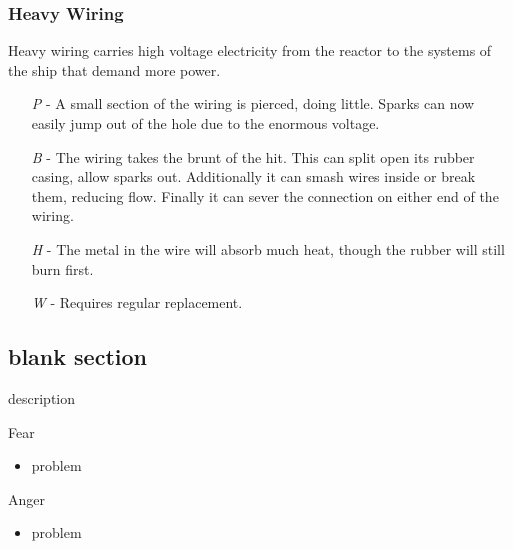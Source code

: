 \documentclass[a4paper]{article}
\begin{document}
\vspace{-0.5cm} \hspace{-18pt} \subsubsection{Heavy Wiring} \label{grid_heavy_wiring} \vspace{-0.2cm}
Heavy wiring carries high voltage electricity from the reactor to the systems of the ship that demand more power.
\begin{enumerate}
\item [\textit{P}] - A small section of the wiring is pierced, doing little. Sparks can now easily jump out of the hole due to the enormous voltage.
\item [\textit{B}] - The wiring takes the brunt of the hit. This can split open its rubber casing, allow sparks out. Additionally it can smash wires inside or break them, reducing flow. Finally it can sever the connection on either end of the wiring.
\item [\textit{H}] - The metal in the wire will absorb much heat, though the rubber will still burn first.
\item [\textit{W}] - Requires regular replacement.
\end{enumerate}














\subsection{blank section} \label{blank}

description

\vspace{0.3cm}
\begin{minipage}[t]{0.4\linewidth}
Fear
\begin{itemize}
\item problem
\end{itemize}
\end{minipage} 
\begin{minipage}[t]{0.4\linewidth}
Anger
\begin{itemize}
\item problem
\end{itemize}
\end{minipage}
\end{document}
